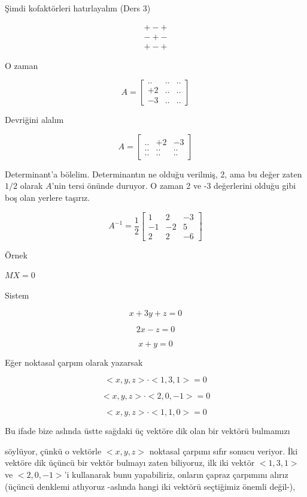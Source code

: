 \documentclass[12pt,fleqn]{article}\usepackage{../../common}
\begin{document}
Şimdi kofaktörleri hatırlayalım (Ders 3)

$$ 
\begin{array}{rr}
+ - + \\
- + - \\
+ - + 
\end{array}
 $$

O zaman

$$ A = 
\left[\begin{array}{rrr}
.. & .. & ..\\
+2 & .. & ..\\
-3 & .. & ..
\end{array}\right]
 $$

Devriğini alalım

$$ A = 
\left[\begin{array}{rrr}
.. & +2 & -3\\
.. & .. & ..\\
.. & .. & ..
\end{array}\right]
 $$

Determinant'a bölelim. Determinantın ne olduğu verilmiş, 2, ama bu değer
zaten $1/2$ olarak $A$'nin tersi önünde duruyor. O zaman 2 ve -3
değerlerini olduğu gibi boş olan yerlere taşırız.

$$ A^{-1} = \frac{1}{2}
\left[\begin{array}{rrr}
1 & 2 & -3 \\
-1 & -2 & 5 \\
2 & 2 & -6
\end{array}\right]
 $$

Örnek

$MX = 0$

Sistem

$$ x + 3y + z = 0 $$

$$ 2x - z  = 0$$

$$ x + y = 0 $$

Eğer noktasal çarpım olarak yazarsak 

$$ < x,y,z > \cdot < 1,3,1 > = 0 $$

$$ < x,y,z > \cdot < 2,0,-1 > = 0 $$

$$ < x,y,z > \cdot < 1,1,0 > = 0 $$

Bu ifade bize aslında üstte sağdaki üç vektöre dik olan bir vektörü bulmamızı

söylüyor, çünkü o vektörle $<x,y,z >$ noktasal çarpımı sıfır sonucu veriyor. İki
vektöre dik üçüncü bir vektör bulmayı zaten biliyoruz, ilk iki vektör $< 1,3,1
>$ ve $< 2,0,-1 >$'i kullanarak bunu yapabiliriz, onların çapraz çarpımını
alırız (üçüncü denklemi atlıyoruz -aslında hangi iki vektörü seçtiğimiz önemli
değil-),
\end{document}
